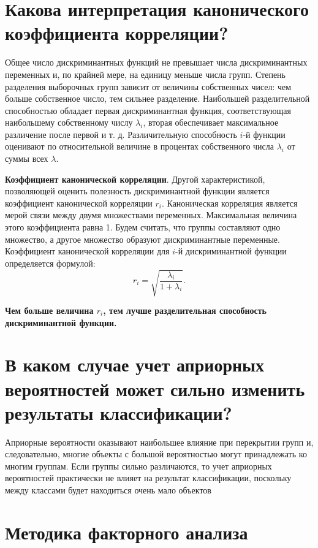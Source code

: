 \documentclass[a4paper, 12pt]{article}
\begin{document}
\section{Какова интерпретация канонического коэффициента корреляции?}
Общее число дискриминантных функций не превышает числа дискриминантных переменных и, по крайней мере, на единицу меньше числа групп. Степень разделения выборочных групп зависит от величины собственных чисел: чем больше собственное число, тем сильнее разделение. Наибольшей разделительной способностью обладает первая дискриминантная функция, соответствующая наибольшему собственному числу $\lambda_i$, вторая обеспечивает максимальное различение после первой и т. д. Различительную способность $i$-й функции оценивают по относительной величине в процентах собственного числа  $\lambda_i$ от суммы всех  $\lambda$.

\textbf{Коэффициент канонической корреляции}. Другой характеристикой, позволяющей оценить полезность дискриминантной функции является коэффициент канонической корреляции  $r_i$. Каноническая корреляция является мерой связи между двумя множествами переменных. Максимальная величина этого коэффициента равна 1. Будем считать, что группы составляют одно множество, а другое множество образуют дискриминантные переменные. Коэффициент канонической корреляции для $i$-й дискриминантной функции определяется формулой: $$r_i = \sqrt{\dfrac{\lambda_i}{1+\lambda_i}}.$$

\textbf{Чем больше величина  $r_i$, тем лучше разделительная способность дискриминантной функции.}

\section{В каком случае учет априорных вероятностей может сильно изменить результаты классификации?}
Априорные вероятности оказывают наибольшее влияние при перекрытии групп и, следовательно, многие объекты с большой вероятностью могут принадлежать ко многим группам. Если группы сильно различаются, то учет априорных вероятностей практически не влияет на результат классификации, поскольку между классами будет находиться очень мало объектов
\section{Методика факторного анализа}
\end{document}
